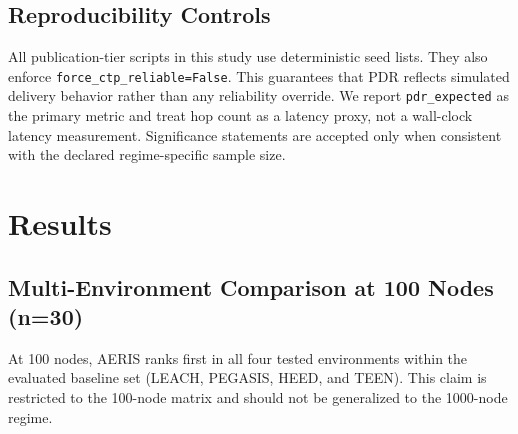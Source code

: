 \documentclass[sensors,article,submit,moreauthors,pdftex]{Definitions/mdpi}
\begin{document}
\subsection{Reproducibility Controls}
All publication-tier scripts in this study use deterministic seed lists. They also enforce \texttt{force\_ctp\_reliable=False}. This guarantees that PDR reflects simulated delivery behavior rather than any reliability override. We report \texttt{pdr\_expected} as the primary metric and treat hop count as a latency proxy, not a wall-clock latency measurement. Significance statements are accepted only when consistent with the declared regime-specific sample size.

\section{Results}
\subsection{Multi-Environment Comparison at 100 Nodes (n=30)}
\begin{table}[H]
\caption{PDR by environment at 100 nodes (mean $\pm$ std; standard deviations are reported as stored in the source result file).}
\label{tab:pdr100}
\centering
{}
\end{table}

At 100 nodes, AERIS ranks first in all four tested environments within the evaluated baseline set (LEACH, PEGASIS, HEED, and TEEN). This claim is restricted to the 100-node matrix and should not be generalized to the 1000-node regime.
\end{document}
